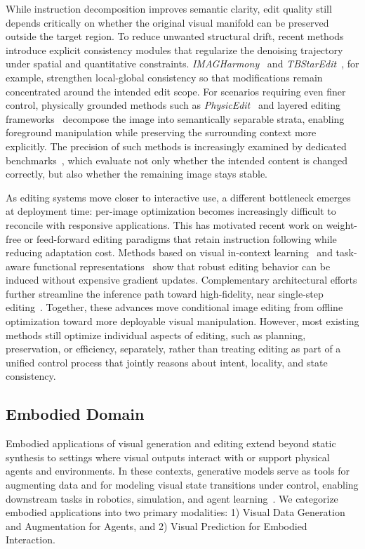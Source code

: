 While instruction decomposition improves semantic clarity, edit quality still depends critically on whether the original visual manifold can be preserved outside the target region. To reduce unwanted structural drift, recent methods introduce explicit consistency modules that regularize the denoising trajectory under spatial and quantitative constraints. \textit{IMAGHarmony}~\citep{Shen2025IMAGHarmonyCI} and \textit{TBStarEdit}~\citep{Fang2025TBStarEditFI}, for example, strengthen local-global consistency so that modifications remain concentrated around the intended edit scope. For scenarios requiring even finer control, physically grounded methods such as \textit{PhysicEdit}~\citep{PhysicEdit} and layered editing frameworks~\citep{Yang2026ControllableLI} decompose the image into semantically separable strata, enabling foreground manipulation while preserving the surrounding context more explicitly. The precision of such methods is increasingly examined by dedicated benchmarks~\citep{Ghazanfari2025SpotEditEV}, which evaluate not only whether the intended content is changed correctly, but also whether the remaining image stays stable.

As editing systems move closer to interactive use, a different bottleneck emerges at deployment time: per-image optimization becomes increasingly difficult to reconcile with responsive applications. This has motivated recent work on weight-free or feed-forward editing paradigms that retain instruction following while reducing adaptation cost. Methods based on visual in-context learning~\citep{Zhang2025InContextEE} and task-aware functional representations~\citep{Mao2025VisualAM, Ma2025X2EditRA} show that robust editing behavior can be induced without expensive gradient updates. Complementary architectural efforts further streamline the inference path toward high-fidelity, near single-step editing~\citep{Liu2025Step1XEditAP, Yao2025ImplementationFF}. Together, these advances move conditional image editing from offline optimization toward more deployable visual manipulation. However, most existing methods still optimize individual aspects of editing, such as planning, preservation, or efficiency, separately, rather than treating editing as part of a unified control process that jointly reasons about intent, locality, and state consistency.


\subsection{Embodied Domain}
Embodied applications of visual generation and editing extend beyond static synthesis to settings where visual outputs interact with or support physical agents and environments. In these contexts, generative models serve as tools for augmenting data and for modeling visual state transitions under control, enabling downstream tasks in robotics, simulation, and agent learning~\citep{meietal2026videoroboticsurvey,li2025uva,zhu2025uwm}. 
We categorize embodied applications into two primary modalities: 1) Visual Data Generation and Augmentation for Agents, and 2) Visual Prediction for Embodied Interaction.

